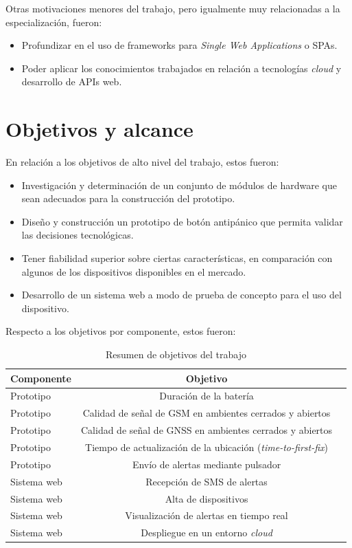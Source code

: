 Otras motivaciones menores del trabajo, pero igualmente muy relacionadas a la especialización, fueron:
\begin{itemize}
\item Profundizar en el uso de frameworks para \textit{Single Web Applications} o SPAs.
\item Poder aplicar los conocimientos trabajados en relación a tecnologías \textit{cloud} y desarrollo de APIs web.
\end{itemize}


\section{Objetivos y alcance}

En relación a los objetivos de alto nivel del trabajo, estos fueron:
\begin{itemize}
\item Investigación y determinación de un conjunto de módulos de hardware que sean adecuados para la construcción del prototipo.
\item Diseño y construcción un prototipo de botón antipánico que permita validar las decisiones tecnológicas.
\item Tener fiabilidad superior sobre ciertas características, en comparación con algunos de los dispositivos disponibles en el mercado.
\item Desarrollo de un sistema web a modo de prueba de concepto para el uso del dispositivo.
\end{itemize}

Respecto a los objetivos por componente, estos fueron:

\begin{table}[h]
	\centering
	\caption[Resumen de objetivos]{Resumen de objetivos del trabajo}
	\begin{tabular}{l c c}    
		\toprule
		\textbf{Componente} 	 & \textbf{Objetivo} 	  \\
		\midrule
		Prototipo & Duración de la batería 				\\		
		Prototipo & Calidad de señal de GSM en ambientes cerrados y abiertos			\\
		Prototipo & Calidad de señal de GNSS en ambientes cerrados y abiertos			\\
		Prototipo & Tiempo de actualización de la ubicación (\textit{time-to-first-fix}) \\
		Prototipo & Envío de alertas mediante pulsador		\\
		Sistema web & Recepción de SMS de alertas			\\
		Sistema web & Alta de dispositivos			\\
		Sistema web & Visualización de alertas en tiempo real			\\
		Sistema web & Despliegue en un entorno \textit{cloud}			\\
		\bottomrule
		\hline
	\end{tabular}
	\label{tab:peces}
\end{table}

